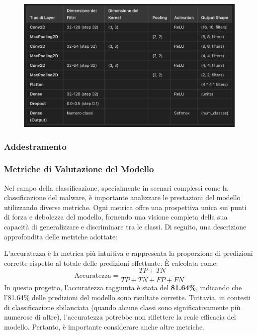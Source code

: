 \begin{figure}[ht]
    \centering
        \centering
        \includegraphics[width=0.8\linewidth]{images/cnn_architecture.png}
        \label{fig:cnn_architecture}
\end{figure}

\subsubsection{Addestramento}

\subsubsection{Metriche di Valutazione del Modello}

Nel campo della classificazione, specialmente in scenari complessi come la classificazione del malware, è importante analizzare le prestazioni del modello utilizzando diverse metriche. Ogni metrica offre una prospettiva unica sui punti di forza e debolezza del modello, fornendo una visione completa della sua capacità di generalizzare e discriminare tra le classi. Di seguito, una descrizione approfondita delle metriche adottate:

L'accuratezza è la metrica più intuitiva e rappresenta la proporzione di predizioni corrette rispetto al totale delle predizioni effettuate. È calcolata come:
\[
\text{Accuratezza} = \frac{TP + TN}{TP + TN + FP + FN}
\]
In questo progetto, l'accuratezza raggiunta è stata del \textbf{81.64\%}, indicando che l'81.64\% delle predizioni del modello sono risultate corrette. Tuttavia, in contesti di classificazione sbilanciata (quando alcune classi sono significativamente più numerose di altre), l'accuratezza potrebbe non riflettere la reale efficacia del modello. Pertanto, è importante considerare anche altre metriche.

